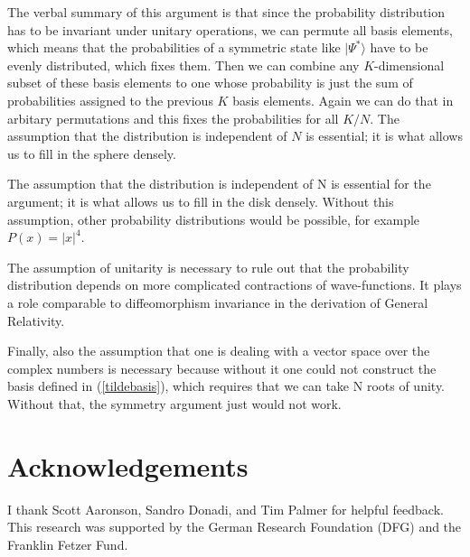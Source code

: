 \documentclass[12pt]{article}
\begin{document}
The verbal summary of this argument is that since the probability distribution has to be invariant under unitary operations, we can permute all basis elements, which means that the probabilities of a symmetric state like $|\Psi^*\rangle$ have to be evenly distributed, which fixes them. Then we can combine any $K$-dimensional subset of these basis elements to one whose probability is just the sum of probabilities assigned to the previous $K$ basis elements. Again we can do that in arbitary permutations and this fixes the probabilities for all $K/N$. The assumption that the distribution is independent of $N$ is essential; it is what allows us to fill in the sphere densely. 

The assumption that the distribution is independent of N is essential for the argument; it is what allows us to fill in the disk densely. Without this assumption, other probability distributions would be possible, for example $P(x) = |x|^4$.

The assumption of unitarity is necessary to rule out that the probability distribution depends on more complicated contractions of wave-functions. It plays a role comparable to diffeomorphism invariance in the derivation of General Relativity.

Finally, also the assumption that one is dealing with a vector space over the complex numbers is necessary because without it one could not construct the basis defined in (\ref{tildebasis}), which requires that we can take N roots of unity. Without that, the symmetry argument just would not work.

\section*{Acknowledgements}

I thank Scott Aaronson, Sandro Donadi, and Tim Palmer for helpful feedback. This research was supported by the German Research Foundation (DFG) and the Franklin Fetzer Fund. 
\end{document}
